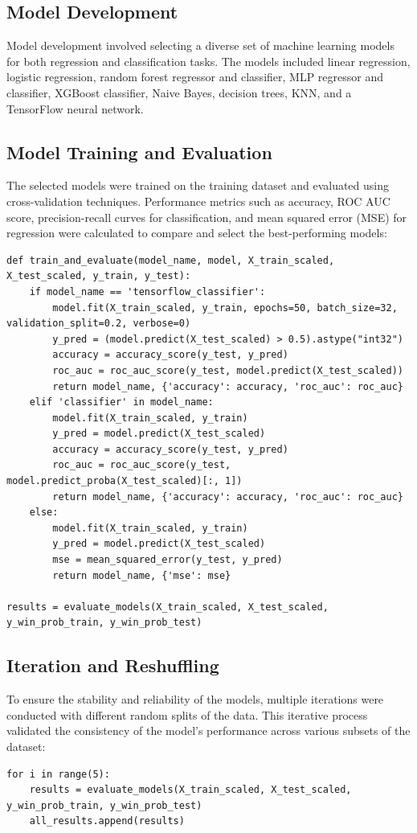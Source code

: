 \documentclass{article}
\begin{document}
\subsection*{Model Development}
Model development involved selecting a diverse set of machine learning models for both regression and classification tasks. The models included linear regression, logistic regression, random forest regressor and classifier, MLP regressor and classifier, XGBoost classifier, Naive Bayes, decision trees, KNN, and a TensorFlow neural network.

\subsection*{Model Training and Evaluation}
The selected models were trained on the training dataset and evaluated using cross-validation techniques. Performance metrics such as accuracy, ROC AUC score, precision-recall curves for classification, and mean squared error (MSE) for regression were calculated to compare and select the best-performing models:
\begin{verbatim}
def train_and_evaluate(model_name, model, X_train_scaled, X_test_scaled, y_train, y_test):
    if model_name == 'tensorflow_classifier':
        model.fit(X_train_scaled, y_train, epochs=50, batch_size=32, validation_split=0.2, verbose=0)
        y_pred = (model.predict(X_test_scaled) > 0.5).astype("int32")
        accuracy = accuracy_score(y_test, y_pred)
        roc_auc = roc_auc_score(y_test, model.predict(X_test_scaled))
        return model_name, {'accuracy': accuracy, 'roc_auc': roc_auc}
    elif 'classifier' in model_name:
        model.fit(X_train_scaled, y_train)
        y_pred = model.predict(X_test_scaled)
        accuracy = accuracy_score(y_test, y_pred)
        roc_auc = roc_auc_score(y_test, model.predict_proba(X_test_scaled)[:, 1])
        return model_name, {'accuracy': accuracy, 'roc_auc': roc_auc}
    else:
        model.fit(X_train_scaled, y_train)
        y_pred = model.predict(X_test_scaled)
        mse = mean_squared_error(y_test, y_pred)
        return model_name, {'mse': mse}

results = evaluate_models(X_train_scaled, X_test_scaled, y_win_prob_train, y_win_prob_test)
\end{verbatim}

\subsection*{Iteration and Reshuffling}
To ensure the stability and reliability of the models, multiple iterations were conducted with different random splits of the data. This iterative process validated the consistency of the model's performance across various subsets of the dataset:
\begin{verbatim}
for i in range(5):
    results = evaluate_models(X_train_scaled, X_test_scaled, y_win_prob_train, y_win_prob_test)
    all_results.append(results)
\end{verbatim}
\end{document}

